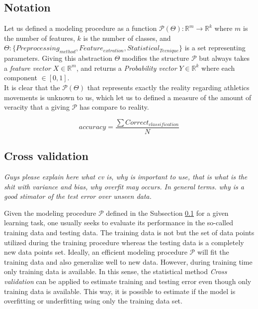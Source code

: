 \subsection{Notation} \label{notation}
Let us defined a modeling procedure as  a function $\mathcal{P}(\Theta): \mathbb{R}^{m} \longrightarrow \mathbb{R}^{k}$ where $m$ is the number of features, $k$ is the number of classes, and $\Theta : \{Preprocessing_{method}, Feature_{extration}, Statistical_{Tecnique} \}$ is a set representing parameters. Giving this abstraction $\Theta$ modifies the structure  $\mathcal{P}$ but always takes a \textit{feature vector} $X \in  \mathbb{R}^{m}$, and returns a \textit{Probability vector} $Y \in  \mathbb{R}^{k}$ where each component $\in  [0,1]$.\\

It is clear that the $\mathcal{P}(\Theta)$ that represents exactly the reality regarding athletics movements is unknown to us, which let us to defined a measure of the amount of veracity that a giving $\mathcal{P}$ has compare to reality.

\begin{equation}
accuracy=  \frac{\sum Correct_{classification}}{N}
\end{equation}

\subsection{Cross validation}

\textit{Guys please explain here what cv is, why is important to use, that is what is the shit with variance and bias, why overfit may occurs. In general terms. why is a good stimator of the test error over unseen data.}

Given the modeling procedure $\mathcal{P}$ defined in the Subsection \ref{notation} 
for a given learning task, one usually seeks to evaluate its performance in the 
so-called training data and testing data. The training data is not but the set of 
data points utilized during the training procedure whereas the testing data is a 
completely new data points set. Ideally, an efficient modeling procedure 
$\mathcal{P}$ will fit the training data and also generalize well to new data. 
However, during training time only training data is available. In this sense, the 
statistical method \textit{Cross validation} can be applied to estimate training 
and testing error even though only training data is available. This way, it is 
possible to estimate if the model is overfitting or underfitting using only the 
training data set.

